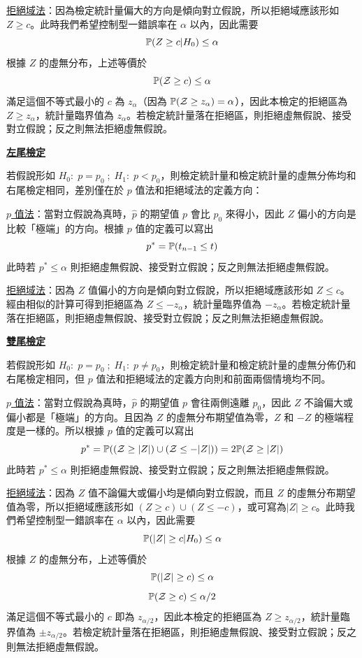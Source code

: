     \noindent \underline{拒絕域法}：因為檢定統計量偏大的方向是傾向對立假說，所以拒絕域應該形如 $Z \ge c$。此時我們希望控制型一錯誤率在 $\alpha$ 以內，因此需要
    \[\mathbb{P}(Z \ge c|H_0) \le \alpha\]
    根據 $Z$ 的虛無分布，上述等價於
    \[\mathbb{P}(\mathcal{Z} \ge c) \le \alpha\]
    滿足這個不等式最小的 $c$ 為 $z_{\alpha}$（因為 $\mathbb{P}(\mathcal{Z} \ge z_{\alpha}) = \alpha$），因此本檢定的拒絕區為 $Z \ge z_{\alpha}$，統計量臨界值為 $z_{\alpha}$。若檢定統計量落在拒絕區，則拒絕虛無假說、接受對立假說；反之則無法拒絕虛無假說。

    \noindent\underline{\textbf{左尾檢定}}

    若假說形如 $H_0: \; p = p_0 \; ; \; H_1: \; p < p_0$，則檢定統計量和檢定統計量的虛無分佈均和右尾檢定相同，差別僅在於 $p$ 值法和拒絕域法的定義方向：

    \noindent \underline{$p$ 值法}：當對立假說為真時，$\hat{p}$ 的期望值 $p$ 會比 $p_0$ 來得小，因此 $Z$ 偏小的方向是比較「極端」的方向。根據 $p$ 值的定義可以寫出
    \[p^* = \mathbb{P}(t_{n-1} \le t)\]
    此時若 $p^* \le \alpha$ 則拒絕虛無假說、接受對立假說；反之則無法拒絕虛無假說。
    
    \noindent \underline{拒絕域法}：因為 $Z$ 值偏小的方向是傾向對立假說，所以拒絕域應該形如 $Z \le c$。經由相似的計算可得到拒絕區為 $Z \le -z_{\alpha}$，統計量臨界值為 $-z_{\alpha}$。若檢定統計量落在拒絕區，則拒絕虛無假說、接受對立假說；反之則無法拒絕虛無假說。

    \noindent\underline{\textbf{雙尾檢定}}

    若假說形如 $H_0: \; p = p_0 \; ; \; H_1: \; p \ne p_0$，則檢定統計量和檢定統計量的虛無分佈仍和右尾檢定相同，但 $p$ 值法和拒絕域法的定義方向則和前面兩個情境均不同。

    \noindent \underline{$p$ 值法}：當對立假說為真時，$\hat{p}$ 的期望值 $p$ 會往兩側遠離 $p_0$，因此 $Z$ 不論偏大或偏小都是「極端」的方向。且因為 $Z$ 的虛無分布期望值為零，$Z$ 和 $-Z$ 的極端程度是一樣的。所以根據 $p$ 值的定義可以寫出
    \[p^* = \mathbb{P}((\mathcal{Z} \ge |Z|)\cup(\mathcal{Z} \le -|Z|)) = 2\mathbb{P}(\mathcal{Z} \ge |Z|)\]
    此時若 $p^* \le \alpha$ 則拒絕虛無假說、接受對立假說；反之則無法拒絕虛無假說。
    
    \noindent \underline{拒絕域法}：因為 $Z$ 值不論偏大或偏小均是傾向對立假說，而且 $Z$ 的虛無分布期望值為零，所以拒絕域應該形如 $(Z \ge c)\cup(Z \le -c)$，或可寫為$|Z| \ge c$。此時我們希望控制型一錯誤率在 $\alpha$ 以內，因此需要
    \[\mathbb{P}(|Z| \ge c|H_0) \le \alpha\]
    根據 $Z$ 的虛無分布，上述等價於
    \[\mathbb{P}(|\mathcal{Z}| \ge c) \le \alpha\]
    \[\mathbb{P}(\mathcal{Z} \ge c) \le \alpha/2\]
    滿足這個不等式最小的 $c$ 即為 $z_{\alpha/2}$，因此本檢定的拒絕區為 $Z \ge z_{\alpha/2}$，統計量臨界值為 $\pm z_{\alpha/2}$。若檢定統計量落在拒絕區，則拒絕虛無假說、接受對立假說；反之則無法拒絕虛無假說。

